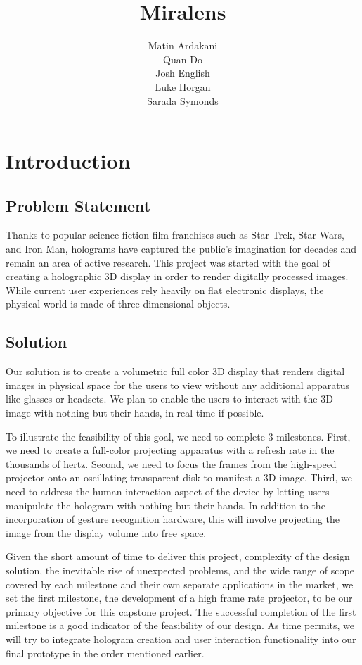 \documentclass[12pt]{article}
\title{\textbf{Miralens}}
\author{Matin Ardakani\\Quan Do\\Josh English\\Luke Horgan\\Sarada Symonds}
\date{}
\begin{document}
\maketitle

\section{Introduction}

\subsection{Problem Statement}
Thanks to popular science fiction film franchises such as Star Trek, Star Wars, and Iron Man, holograms have captured the public’s imagination for decades and remain an area of active research. This project was started with the goal of creating a holographic 3D display in order to render digitally processed images. While current user experiences rely heavily on flat electronic displays, the physical world is made of three dimensional objects.

\subsection{Solution}
Our solution is to create a volumetric full color 3D display that renders digital images in physical space for the users to view without any additional apparatus like glasses or headsets. We plan to enable the users to interact with the 3D image with nothing but their hands, in real time if possible.

To illustrate the feasibility of this goal, we need to complete 3 milestones. First, we need to create a full-color projecting apparatus with a refresh rate in the thousands of hertz. Second, we need to focus the frames from the high-speed projector onto an oscillating transparent disk to manifest a 3D image. Third, we need to address the human interaction aspect of the device by letting users manipulate the hologram with nothing but their hands. In addition to the incorporation of gesture recognition hardware, this will involve projecting the image from the display volume into free space.

Given the short amount of time to deliver this project, complexity of the design solution, the inevitable rise of unexpected problems, and the wide range of scope covered by each milestone and their own separate applications in the market, we set the first milestone, the development of a high frame rate projector, to be our primary objective for this capstone project. The successful completion of the first milestone is a good indicator of the feasibility of our design. As time permits, we will try to integrate hologram creation and user interaction functionality into our final prototype in the order mentioned earlier.
\end{document}
